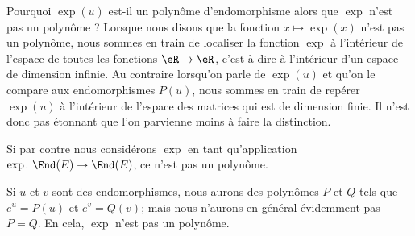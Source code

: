 \begin{remark}
    Pourquoi \( \exp(u)\) est-il un polynôme d'endomorphisme alors que \( \exp\) n'est pas un polynôme ? Lorsque nous disons que la fonction \( x\mapsto \exp(x)\) n'est pas un polynôme, nous sommes en train de localiser la fonction \( \exp\) à l'intérieur de l'espace de toutes les fonctions \( \eR\to \eR\), c'est à dire à l'intérieur d'un espace de dimension infinie. Au contraire lorsqu'on parle de \( \exp(u)\) et qu'on le compare aux endomorphismes \( P(u)\), nous sommes en train de repérer \( \exp(u)\) à l'intérieur de l'espace des matrices qui est de dimension finie. Il n'est donc pas étonnant que l'on parvienne moins à faire la distinction.

    Si par contre nous considérons \( \exp\) en tant qu'application \( \exp\colon \End(E)\to \End(E)\), ce n'est pas un polynôme.

    Si \( u\) et \( v\) sont des endomorphismes, nous aurons des polynômes \( P\) et \( Q\) tels que \( e^u=P(u)\) et \( e^v=Q(v)\); mais nous n'aurons en général évidemment pas \( P=Q\). En cela, \( \exp\) n'est pas un polynôme.
\end{remark}

